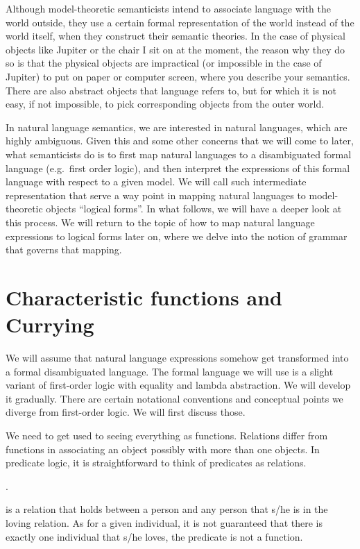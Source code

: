 \documentclass[11pt,a4paper]{article}
\begin{document}
Although model-theoretic semanticists intend to associate language with the world outside, they use a certain formal representation of the world instead of the world itself, when they construct their semantic theories. In the case of physical objects like Jupiter or the chair I sit on at the moment, the reason why they do so is that the physical objects are impractical (or impossible in the case of Jupiter) to put on paper or computer screen, where you describe your semantics. There are also abstract objects that language refers to, but for which it is not easy, if not impossible, to pick corresponding objects from the outer world.

In natural language semantics, we are interested in natural languages, which are highly ambiguous. Given this and some other concerns that we will come to later, what semanticists do is to first map natural languages to a disambiguated formal language (e.g.\ first order logic), and then interpret the expressions of this formal language with respect to a given model. We will call such intermediate representation that serve a way point in mapping natural languages to model-theoretic objects ``logical forms''. In what follows, we will have a deeper look at this process. We will return to the topic of how to map natural language expressions to logical forms later on, where we delve into the notion of grammar that governs that mapping.

\section{Characteristic functions and Currying}

We will assume that natural language expressions somehow get transformed into a formal disambiguated language. The formal language we will use is a slight variant of first-order logic with equality and lambda abstraction. We will develop it gradually. There are certain notational conventions and conceptual points we diverge from first-order logic. We will first discuss those.   

We need to get used to seeing everything as functions. Relations differ from functions in associating an object possibly with more than one objects. In predicate logic, it is straightforward to think of predicates as relations. 

\ex.\label{johnmary}

is a relation that holds between a person and any person that s/he is in the loving relation. As for a given individual, it is not guaranteed that there is exactly one individual that s/he loves, the predicate  is not a function. 
\end{document}
